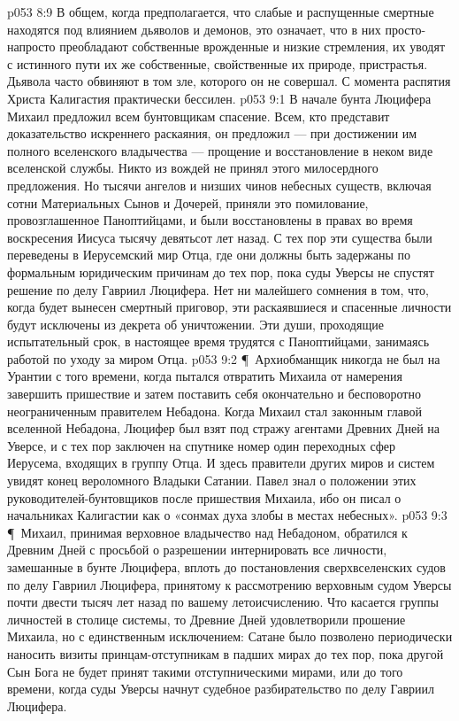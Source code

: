 \vs p053 8:9 В общем, когда предполагается, что слабые и распущенные смертные находятся под влиянием дьяволов и демонов, это означает, что в них просто\hyp{}напросто преобладают собственные врожденные и низкие стремления, их уводят с истинного пути их же собственные, свойственные их природе, пристрастья. Дьявола часто обвиняют в том зле, которого он не совершал. С момента распятия Христа Калигастия практически бессилен.
\vs p053 9:1 В начале бунта Люцифера Михаил предложил всем бунтовщикам спасение. Всем, кто представит доказательство искреннего раскаяния, он предложил --- при достижении им полного вселенского владычества --- прощение и восстановление в неком виде вселенской службы. Никто из вождей не принял этого милосердного предложения. Но тысячи ангелов и низших чинов небесных существ, включая сотни Материальных Сынов и Дочерей, приняли это помилование, провозглашенное Паноптийцами, и были восстановлены в правах во время воскресения Иисуса тысячу девятьсот лет назад. С тех пор эти существа были переведены в Иерусемский мир Отца, где они должны быть задержаны по формальным юридическим причинам до тех пор, пока суды Уверсы не спустят решение по делу Гавриил  Люцифера. Нет ни малейшего сомнения в том, что, когда будет вынесен смертный приговор, эти раскаявшиеся и спасенные личности будут исключены из декрета об уничтожении. Эти души, проходящие испытательный срок, в настоящее время трудятся с Паноптийцами, занимаясь работой по уходу за миром Отца.
\vs p053 9:2 \P\ Архиобманщик никогда не был на Урантии с того времени, когда пытался отвратить Михаила от намерения завершить пришествие и затем поставить себя окончательно и бесповоротно неограниченным правителем Небадона. Когда Михаил стал законным главой вселенной Небадона, Люцифер был взят под стражу агентами Древних Дней на Уверсе, и с тех пор заключен на спутнике номер один переходных сфер Иерусема, входящих в группу Отца. И здесь правители других миров и систем увидят конец вероломного Владыки Сатании. Павел знал о положении этих руководителей\hyp{}бунтовщиков после пришествия Михаила, ибо он писал о начальниках Калигастии как о «сонмах духа злобы в местах небесных».
\vs p053 9:3 \P\ Михаил, принимая верховное владычество над Небадоном, обратился к Древним Дней с просьбой о разрешении интернировать все личности, замешанные в бунте Люцифера, вплоть до постановления сверхвселенских судов по делу Гавриил  Люцифера, принятому к рассмотрению верховным судом Уверсы почти двести тысяч лет назад по вашему летоисчислению. Что касается группы личностей в столице системы, то Древние Дней удовлетворили прошение Михаила, но с единственным исключением: Сатане было позволено периодически наносить визиты принцам\hyp{}отступникам в падших мирах до тех пор, пока другой Сын Бога не будет принят такими отступническими мирами, или до того времени, когда суды Уверсы начнут судебное разбирательство по делу Гавриил  Люцифера.
